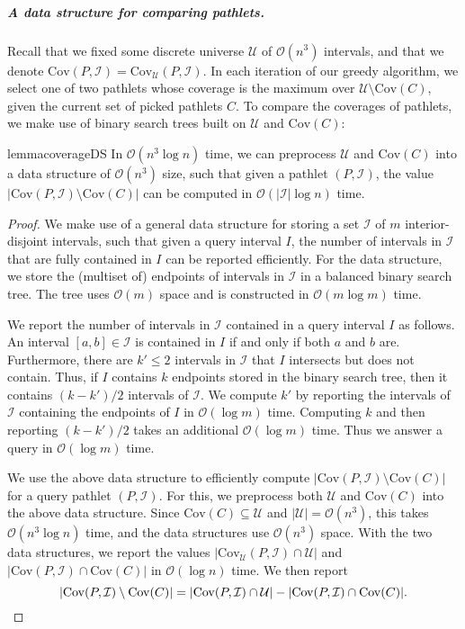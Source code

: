 \documentclass[a4paper,UKenglish,cleveref,thm-restate,notab]{lipics-v2021}
\newcommand{\bigO}{\mathcal{O}}
\newcommand{\I}{\mathcal{I}}
\newcommand{\U}{\mathcal{U}}
\newcommand{\Cov}{\ensuremath{\mathrm{Cov}}}
\begin{document}
\subparagraph*{A data structure for comparing pathlets.}
    Recall that we fixed some discrete universe $\U$ of $\bigO(n^3)$ intervals, and that we denote $\Cov(P, \I) = \Cov_\U(P, \I)$.
    In each iteration of our greedy algorithm, we select one of two pathlets whose  coverage is the maximum over $\U \setminus \Cov(C)$, given the current set of picked pathlets $C$.
    To compare the coverages of pathlets, we make use of binary search trees built on $\U$ and $\Cov(C)$:

    \begin{restatable}{lemma}{coverageDS}
    \label{lem:coverage_ds}
        In $\bigO(n^3 \log n)$ time, we can preprocess $\U$ and $\Cov(C)$ into a data structure of $\bigO(n^3)$ size, such that given a pathlet $(P, \I)$, the value $| \Cov(P, \I) \setminus \Cov(C) |$ can be computed in $\bigO(|\I| \log n)$ time.
    \end{restatable}
    \begin{proof}
        We make use of a general data structure for storing a set $\I$ of $m$ interior-disjoint intervals, such that given a query interval $I$, the number of intervals in $\I$ that are fully contained in $I$ can be reported efficiently.
        For the data structure, we store the (multiset of) endpoints of intervals in $\I$ in a balanced binary search tree.
        The tree uses $\bigO(m)$ space and is constructed in $\bigO(m \log m)$ time.
        
        We report the number of intervals in $\I$ contained in a query interval $I$ as follows.
        An interval $[a, b] \in \I$ is contained in $I$ if and only if both $a$ and $b$ are.
        Furthermore, there are $k' \leq 2$ intervals in $\I$ that $I$ intersects but does not contain.
        Thus, if $I$ contains $k$ endpoints stored in the binary search tree, then it contains $(k-k') / 2$ intervals of $\I$.
        We compute $k'$ by reporting the intervals of $\I$ containing the endpoints of $I$ in $\bigO(\log m)$ time.
        Computing $k$ and then reporting $(k-k') / 2$ takes an additional $\bigO(\log m)$ time.
        Thus we answer a query in $\bigO(\log m)$ time.

        We use the above data structure to efficiently compute $| \Cov(P, \I) \setminus \Cov(C) |$ for a query pathlet $(P, \I)$.
        For this, we preprocess both $\U$ and $\Cov(C)$ into the above data structure.
        Since $\Cov(C) \subseteq \U$ and $|\U| = \bigO(n^3)$, this takes $\bigO(n^3 \log n)$ time, and the data structures use $\bigO(n^3)$ space.
        With the two data structures, we report the values $| \Cov_\U(P, \I) \cap \U |$ and $| \Cov(P, \I) \cap \Cov(C) |$ in $\bigO(\log n)$ time.
        We then report
        \[
            | \Cov(P, \I) \setminus \Cov(C) | = | \Cov(P, \I) \cap \U | - | \Cov(P, \I) \cap \Cov(C) |.\qedhere
        \]
    \end{proof}
\end{document}
